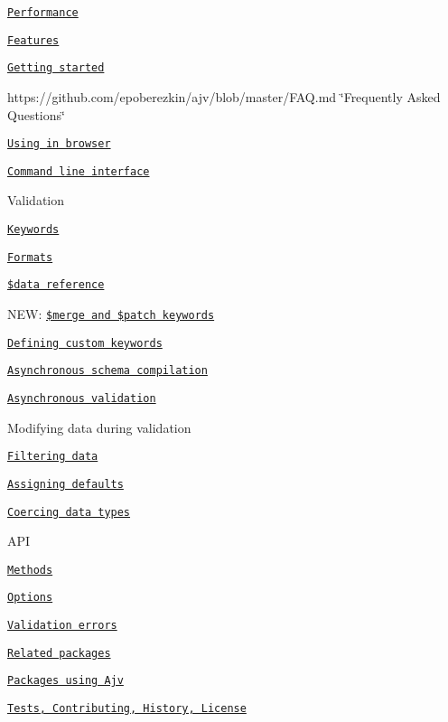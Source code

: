\begin{DoxyItemize}
\item \href{#performance}{\tt Performance}
\item \href{#features}{\tt Features}
\item \href{#getting-started}{\tt Getting started}
\item https\+://github.com/epoberezkin/ajv/blob/master/\+F\+A\+Q.\+md \char`\"{}\+Frequently Asked Questions\char`\"{}
\item \href{#using-in-browser}{\tt Using in browser}
\item \href{#command-line-interface}{\tt Command line interface}
\item Validation
\begin{DoxyItemize}
\item \href{#validation-keywords}{\tt Keywords}
\item \href{#formats}{\tt Formats}
\item \href{#data-reference}{\tt \$data reference}
\item N\+EW\+: \href{#merge-and-patch-keywords}{\tt \$merge and \$patch keywords}
\item \href{#defining-custom-keywords}{\tt Defining custom keywords}
\item \href{#asynchronous-compilation}{\tt Asynchronous schema compilation}
\item \href{#asynchronous-validation}{\tt Asynchronous validation}
\end{DoxyItemize}
\item Modifying data during validation
\begin{DoxyItemize}
\item \href{#filtering-data}{\tt Filtering data}
\item \href{#assigning-defaults}{\tt Assigning defaults}
\item \href{#coercing-data-types}{\tt Coercing data types}
\end{DoxyItemize}
\item A\+PI
\begin{DoxyItemize}
\item \href{#api}{\tt Methods}
\item \href{#options}{\tt Options}
\item \href{#validation-errors}{\tt Validation errors}
\end{DoxyItemize}
\item \href{#related-packages}{\tt Related packages}
\item \href{#some-packages-using-ajv}{\tt Packages using Ajv}
\item \href{#tests}{\tt Tests, Contributing, History, License}
\end{DoxyItemize}

